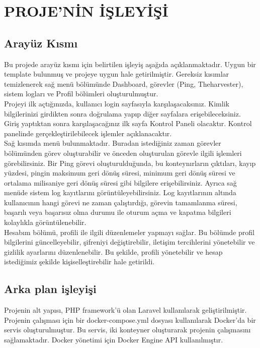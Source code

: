\section{PROJE'NİN İŞLEYİŞİ}
\subsection{Arayüz Kısmı }
Bu projede arayüz kısmı için belirtilen işleyiş aşağıda açıklanmaktadır. Uygun bir template bulunmuş ve projeye uygun hale getirilmiştir. Gereksiz kısımlar temizlenerek sağ menü bölümünde Dashboard, görevler (Ping, Theharvester), sistem logları ve Profil bölümleri oluşturulmuştur.\\
Projeyi ilk açtığınızda, kullanıcı login sayfasıyla karşılaşacaksınız. Kimlik bilgilerinizi girdikten sonra doğrulama yapıp diğer sayfalara erişebileceksiniz. Giriş yaptıktan sonra karşılaşacağınız ilk sayfa Kontrol Paneli olacaktır. Kontrol panelinde gerçekleştirilebilecek işlemler açıklanacaktır.\\
Sağ kısımda menü bulunmaktadır. Buradan istediğiniz zaman görevler bölümünden görev oluşturabilir ve önceden oluşturulan görevle ilgili işlemleri görebilirsiniz. Bir Ping görevi oluşturulduğunda, bu konteynırların çıktıları, kayıp yüzdesi, pingin maksimum geri dönüş süresi, minimum geri dönüş süresi ve ortalama milisaniye geri dönüş süresi gibi bilgilere erişebilirsiniz. Ayrıca sağ menüde sistem log kayıtlarını görüntüleyebilirsiniz. Log kayıtlarının altında kullanıcının hangi görevi ne zaman çalıştırdığı, görevin tamamlanma süresi, başarılı veya başarısız olma durumu ile oturum açma ve kapatma bilgileri kolaylıkla görüntülenebilir.\\
Hesabım bölümü, profili ile ilgili düzenlemeler yapmayı sağlar. Bu bölümde profil bilgilerini güncelleyebilir, şifreniyi değiştirebilir, iletişim tercihlerini yönetebilir ve gizlilik ayarlarını düzenlenebilir. Bu şekilde, profili yönetebilir ve hesap istediğimiz  şekilde kişiselleştirebilir hale getirildi.
\subsection{Arka plan işleyişi}
Projenin alt yapısı, PHP framework'ü olan Laravel kullanılarak geliştirilmiştir. Projenin çalışması için bir docker-compose.yml dosyası kullanılarak Docker'da bir servis oluşturulmuştur. Bu servis, iki konteyner oluşturarak projenin çalışmasını sağlamaktadır. Docker yönetimi için Docker Engine API kullanılmıştır.

